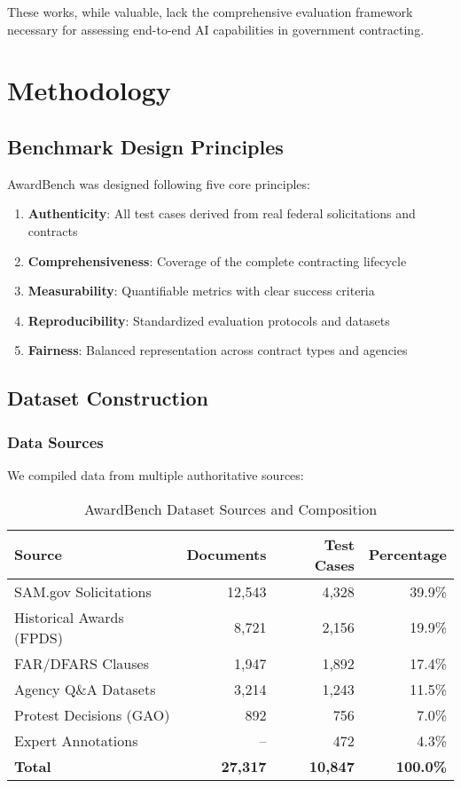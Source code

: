 \documentclass[11pt,a4paper]{article}
\begin{document}
These works, while valuable, lack the comprehensive evaluation framework necessary for assessing end-to-end AI capabilities in government contracting.

\section{Methodology}

\subsection{Benchmark Design Principles}

AwardBench was designed following five core principles:

\begin{enumerate}
    \item \textbf{Authenticity}: All test cases derived from real federal solicitations and contracts
    \item \textbf{Comprehensiveness}: Coverage of the complete contracting lifecycle
    \item \textbf{Measurability}: Quantifiable metrics with clear success criteria
    \item \textbf{Reproducibility}: Standardized evaluation protocols and datasets
    \item \textbf{Fairness}: Balanced representation across contract types and agencies
\end{enumerate}

\subsection{Dataset Construction}

\subsubsection{Data Sources}

We compiled data from multiple authoritative sources:

\begin{table}[H]
\centering
\caption{AwardBench Dataset Sources and Composition}
\label{tab:dataset}
\begin{tabular}{@{}lrrr@{}}
\toprule
\textbf{Source} & \textbf{Documents} & \textbf{Test Cases} & \textbf{Percentage} \\
\midrule
SAM.gov Solicitations & 12,543 & 4,328 & 39.9\% \\
Historical Awards (FPDS) & 8,721 & 2,156 & 19.9\% \\
FAR/DFARS Clauses & 1,947 & 1,892 & 17.4\% \\
Agency Q\&A Datasets & 3,214 & 1,243 & 11.5\% \\
Protest Decisions (GAO) & 892 & 756 & 7.0\% \\
Expert Annotations & -- & 472 & 4.3\% \\
\midrule
\textbf{Total} & \textbf{27,317} & \textbf{10,847} & \textbf{100.0\%} \\
\bottomrule
\end{tabular}
\end{table}
\end{document}
